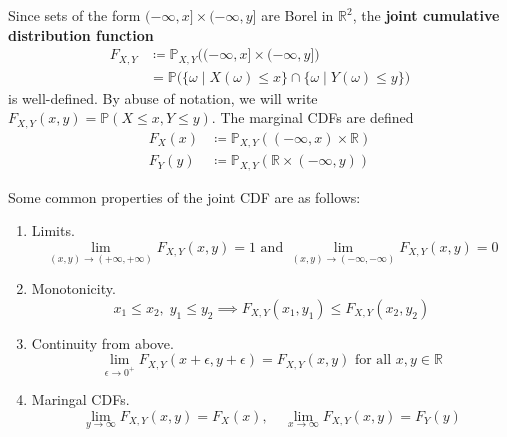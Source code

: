 \documentclass{article}
\begin{document}
    \begin{definition}
      Since sets of the form $(-\infty, x] \times (-\infty, y]$ are Borel in $\mathbb{R}^2$, the \textbf{joint cumulative distribution function} 
      \begin{align*}
        F_{X, Y} & \coloneqq \mathbb{P}_{X, Y} \big( (-\infty, x] \times (-\infty, y] \big) \\
        & = \mathbb{P} \big( \{\omega \mid X(\omega) \leq x\} \cap \{ \omega \mid Y(\omega) \leq y\} \big)
      \end{align*}
      is well-defined. By abuse of notation, we will write $F_{X, Y} (x, y) = \mathbb{P}(X \leq x, Y \leq y)$. The marginal CDFs are defined 
      \begin{align*}
        F_X (x) & \coloneqq \mathbb{P}_{X, Y} ((-\infty, x) \times \mathbb{R}) \\
        F_Y (y) & \coloneqq \mathbb{P}_{X, Y} (\mathbb{R} \times (-\infty, y))
      \end{align*}
    \end{definition}

    \begin{lemma}
      Some common properties of the joint CDF are as follows: 
      \begin{enumerate}
        \item Limits. 
        \begin{equation}
          \lim_{(x, y) \rightarrow (+\infty, +\infty)} F_{X, Y} (x, y) = 1 \text{ and } \lim_{(x, y) \rightarrow (-\infty, -\infty)} F_{X, Y} (x, y) = 0
        \end{equation}
        \item Monotonicity. 
        \begin{equation}
          x_1 \leq x_2, \; y_1 \leq y_2 \implies F_{X, Y} (x_1, y_1) \leq F_{X, Y}(x_2, y_2)
        \end{equation}
        \item Continuity from above. 
        \begin{equation}
          \lim_{\epsilon \rightarrow 0^+} F_{X, Y} (x + \epsilon, y + \epsilon) = F_{X, Y} (x, y) \text{ for all } x, y \in \mathbb{R}
        \end{equation}
        \item Maringal CDFs. 
        \begin{equation}
          \lim_{y \rightarrow \infty} F_{X, Y} (x, y) = F_X (x), \;\;\;\; \lim_{x \rightarrow \infty} F_{X, Y} (x, y) = F_Y (y)
        \end{equation}
      \end{enumerate}
    \end{lemma}
\end{document}
